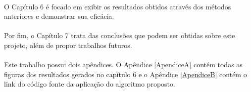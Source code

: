 \paragraph{}O Capítulo 6 é focado em exibir os resultados obtidos através dos métodos anteriores e demonstrar sua eficácia.

\paragraph{}Por fim, o Capítulo 7 trata das conclusões que podem ser obtidas sobre este projeto, além de propor trabalhos futuros.

\paragraph{}Este trabalho possui dois apêndices. O Apêndice \ref{ApendiceA} contém todas as figuras dos resultados gerados no capítulo 6
e o Apêndice \ref{ApendiceB} contém o link do código fonte da aplicação do algoritmo proposto. 